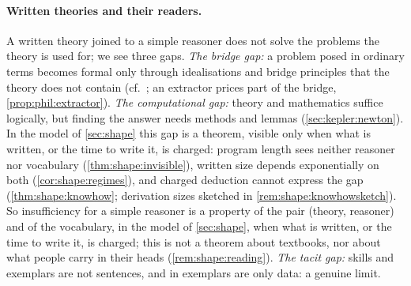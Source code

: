 \paragraph{Written theories and their readers.}\label{sec:limits:textbook}A written theory joined to a simple reasoner does not solve the problems the theory is used for; we see three gaps. \emph{The bridge gap:} a problem posed in ordinary terms becomes formal only through idealisations and bridge principles that the theory does not contain (cf.\ \citealp{cartwright1983how,morgan1999models}; an extractor prices part of the bridge, \cref{prop:phil:extractor}). \emph{The computational gap:} theory and mathematics suffice logically, but finding the answer needs methods and lemmas (\cref{sec:kepler:newton}). In the model of \cref{sec:shape} this gap is a theorem, visible only when what is written, or the time to write it, is charged: program length sees neither reasoner nor vocabulary (\cref{thm:shape:invisible}), written size depends exponentially on both (\cref{cor:shape:regimes}), and charged deduction cannot express the gap (\cref{thm:shape:knowhow}; derivation sizes sketched in \cref{rem:shape:knowhowsketch}). So insufficiency for a simple reasoner is a property of the pair (theory, reasoner) and of the vocabulary, in the model of \cref{sec:shape}, when what is written, or the time to write it, is charged; this is not a theorem about textbooks, nor about what people carry in their heads (\cref{rem:shape:reading}). \emph{The tacit gap:} skills \citep{polanyi1958personal,polanyi1966tacit} and exemplars \citep{kuhn1970structure,kuhn1977second} are not sentences, and in \SAIabbr exemplars are only data: a genuine limit.

